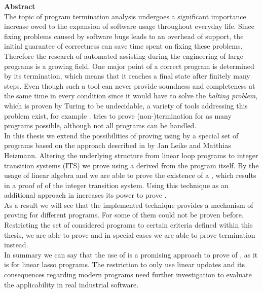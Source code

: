 {\bf\Large Abstract} \\ [1em] 

The topic of program termination analysis undergoes a significant importance increase owed to the expansion of software usage throughout everyday life. Since fixing problems caused by software bugs leads to an overhead of support, the initial guarantee of correctness can save time spent on fixing these problems. Therefore the research of automated assisting during the engineering of large programs is a growing field.
One major point of a correct program is determined by its termination, which means that it reaches a final state after finitely many steps. Even though such a tool can never provide soundness and completeness at the same time in every condition since it would have to solve the \textit{halting problem}, which is proven by Turing to be undecidable, a variety of tools addressing this problem exist, for example \aprove. \aprove tries to prove (non-)termination for as many programs possible, although not all programs can be handled.\newline \\
In this thesis we extend the possibilities of proving \nonterm using \aprove by a special set of programs based on the approach described in \cite{leike2014geometric} by Jan Leike and Matthias Heizmann. Altering the underlying structure from linear loop programs to integer transition systems (ITS) we prove \nonterm using a \textit{\gna} derived from the program itself. By the usage of linear algebra and \solver we are able to prove the existence of a \gna, which results in a proof of \nonterm of the integer transition system. Using this technique as an additional approach in \aprove increases its power to prove \nonterm. 
\\
As a result we will see that the implemented technique provides a mechanism of proving \nonterm for different programs. For some of them \nonterm could not be proven before. Restricting the set of considered programs to certain criteria defined within this thesis, we are able to prove \nonterm and in special cases we are able to prove termination instead. \newline
\\
In summary we can say that the use of \gnas is a promising approach to prove \nonterm of \itss, as it is for linear lasso programs. The restriction to only use linear updates and its consequences regarding modern programs need further investigation to evaluate the applicability in real industrial software.
